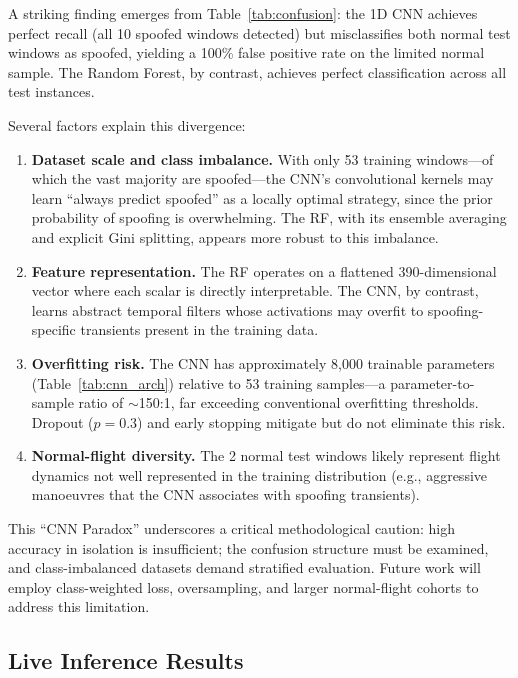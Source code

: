 \documentclass[11pt,a4paper]{article}
\begin{document}
A striking finding emerges from Table~\ref{tab:confusion}: the 1D CNN achieves perfect recall (all 10 spoofed windows detected) but misclassifies both normal test windows as spoofed, yielding a 100\% false positive rate on the limited normal sample. The Random Forest, by contrast, achieves perfect classification across all test instances.

Several factors explain this divergence:

\begin{enumerate}
    \item \textbf{Dataset scale and class imbalance.} With only 53 training windows---of which the vast majority are spoofed---the CNN's convolutional kernels may learn ``always predict spoofed'' as a locally optimal strategy, since the prior probability of spoofing is overwhelming. The RF, with its ensemble averaging and explicit Gini splitting, appears more robust to this imbalance.
    \item \textbf{Feature representation.} The RF operates on a flattened 390-dimensional vector where each scalar is directly interpretable. The CNN, by contrast, learns abstract temporal filters whose activations may overfit to spoofing-specific transients present in the training data.
    \item \textbf{Overfitting risk.} The CNN has approximately 8,000 trainable parameters (Table~\ref{tab:cnn_arch}) relative to 53 training samples---a parameter-to-sample ratio of $\sim$150:1, far exceeding conventional overfitting thresholds. Dropout ($p=0.3$) and early stopping mitigate but do not eliminate this risk.
    \item \textbf{Normal-flight diversity.} The 2 normal test windows likely represent flight dynamics not well represented in the training distribution (e.g., aggressive manoeuvres that the CNN associates with spoofing transients).
\end{enumerate}

This ``CNN Paradox'' underscores a critical methodological caution: high accuracy in isolation is insufficient; the confusion structure must be examined, and class-imbalanced datasets demand stratified evaluation. Future work will employ class-weighted loss, oversampling, and larger normal-flight cohorts to address this limitation.

\subsection{Live Inference Results}
\end{document}
